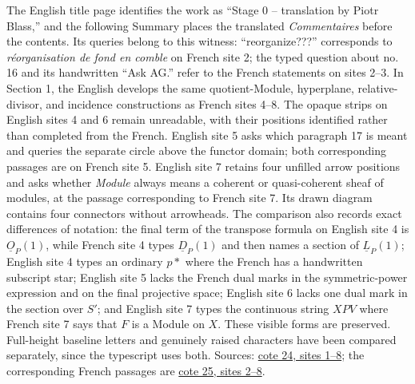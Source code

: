 \documentclass[10pt,a4paper]{article}
\begin{document}
The English title page identifies the work as ``Stage 0 -- translation by Piotr Blass,'' and the following Summary places the translated \emph{Commentaires} before the contents. Its queries belong to this witness: ``reorganize???'' corresponds to \emph{réorganisation de fond en comble} on French site 2; the typed question about no.\,16 and its handwritten ``Ask AG.'' refer to the French statements on sites 2--3. In Section 1, the English develops the same quotient-Module, hyperplane, relative-divisor, and incidence constructions as French sites 4--8. The opaque strips on English sites 4 and 6 remain unreadable, with their positions identified rather than completed from the French. English site 5 asks which paragraph 17 is meant and queries the separate circle above the functor domain; both corresponding passages are on French site 5. English site 7 retains four unfilled arrow positions and asks whether \emph{Module} always means a coherent or quasi-coherent sheaf of modules, at the passage corresponding to French site 7. Its drawn diagram contains four connectors without arrowheads. The comparison also records exact differences of notation: the final term of the transpose formula on English site 4 is $\underline O_P(1)$, while French site 4 types $\underline D_P(1)$ and then names a section of $\underline L_P(1)$; English site 4 types an ordinary $p*$ where the French has a handwritten subscript star; English site 5 lacks the French dual marks in the symmetric-power expression and on the final projective space; English site 6 lacks one dual mark in the section over $S'$; and English site 7 types the continuous string $XPV$ where French site 7 says that $F$ is a Module on $X$. These visible forms are preserved. Full-height baseline letters and genuinely raised characters have been compared separately, since the typescript uses both. Sources: \href{https://grothendieck.umontpellier.fr/web/viewer.html?file=../24.pdf\#page=2}{cote 24, sites 1--8}; the corresponding French passages are \href{https://grothendieck.umontpellier.fr/web/viewer.html?file=../25.pdf\#page=3}{cote 25, sites 2--8}.
\end{document}
